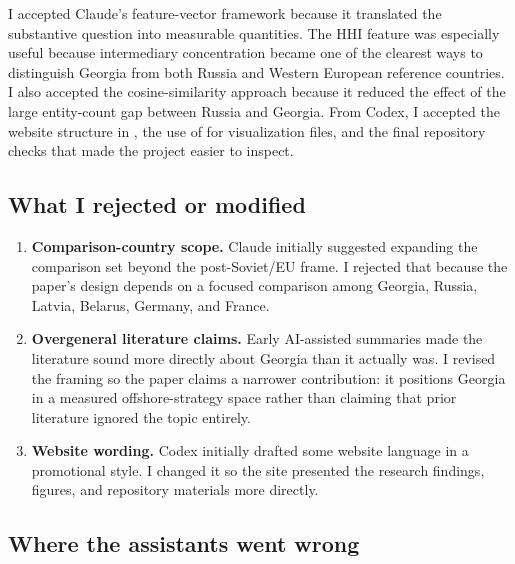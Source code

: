 \documentclass[9pt,twoside]{pnas-new}
\begin{document}
I accepted Claude's feature-vector framework because it translated the substantive question into measurable quantities. The HHI feature was especially useful because intermediary concentration became one of the clearest ways to distinguish Georgia from both Russia and Western European reference countries. I also accepted the cosine-similarity approach because it reduced the effect of the large entity-count gap between Russia and Georgia. From Codex, I accepted the website structure in , the use of  for visualization files, and the final repository checks that made the project easier to inspect.

\subsection*{What I rejected or modified}

\begin{enumerate}
  \item \textbf{Comparison-country scope.} Claude initially suggested expanding the comparison set beyond the post-Soviet/EU frame. I rejected that because the paper's design depends on a focused comparison among Georgia, Russia, Latvia, Belarus, Germany, and France.
  \item \textbf{Overgeneral literature claims.} Early AI-assisted summaries made the literature sound more directly about Georgia than it actually was. I revised the framing so the paper claims a narrower contribution: it positions Georgia in a measured offshore-strategy space rather than claiming that prior literature ignored the topic entirely.
  \item \textbf{Website wording.} Codex initially drafted some website language in a promotional style. I changed it so the site presented the research findings, figures, and repository materials more directly.
\end{enumerate}

\subsection*{Where the assistants went wrong}
\end{document}
